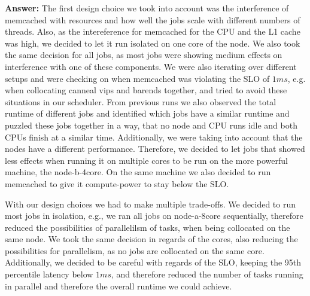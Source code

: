 \begin{enumerate}
\begin{enumerate}
\begin{itemize}
        \textbf{Answer:} %
        The first design choice we took into account was the interference of memcached with resources and how well the jobs scale with different numbers of threads. Also, as the intereference for memcached for the CPU and the L1 cache was high, we decided to let it run isolated on one core of the node. We also took the same decision for all jobs, as most jobs were showing medium effects on interference with one of these components. We were also iterating over different setups and were checking on when memcached was violating the SLO of $1 ms$, e.g. when collocating canneal vips and barends together, and tried to avoid these situations in our scheduler. From previous runs we also observed the total runtime of different jobs and identified which jobs have a similar runtime and puzzled these jobs together in a way, that no node and CPU runs idle and both CPUs finish at a similar time. Additionally, we were taking into account that the nodes have a different performance. Therefore, we decided to let jobs that showed less effects when running it on multiple cores to be run on the more powerful machine, the node-b-4core. On the same machine we also decided to run memcached to give it compute-power to stay below the SLO.

        With our design choices we had to make multiple trade-offs. We decided to run most jobs in isolation, e.g., we ran all jobs on node-a-8core sequentially, therefore reduced the possibilities of parallelilsm of tasks, when being collocated on the same node. We took the same decision in regards of the cores, also reducing the possibilities for parallelism, as no jobs are collocated on the same core. Additionally, we decided to be careful with regards of the SLO, keeping the 95th percentile latency below $1 ms$, and therefore reduced the number of tasks running in parallel and therefore the overall runtime we could achieve.


\end{itemize}
\end{enumerate}
\end{enumerate}

